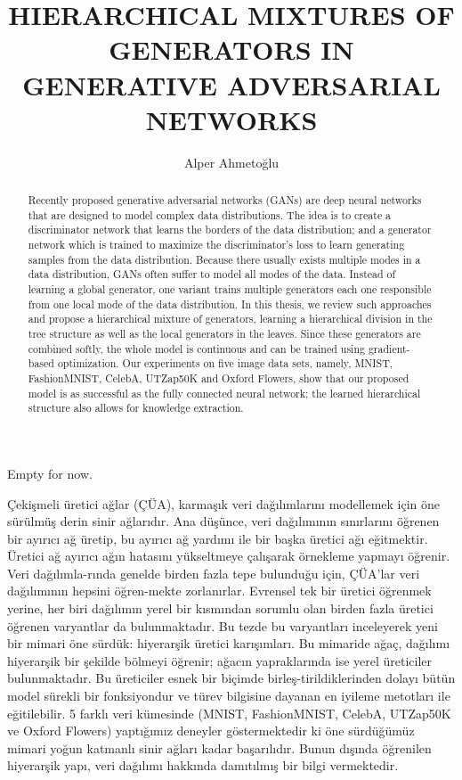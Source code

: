 \documentclass[a4paper,onesided,12pt]{report}
\title{HIERARCHICAL MIXTURES OF GENERATORS IN GENERATIVE ADVERSARIAL NETWORKS}
\author{Alper Ahmetoğlu}
\begin{document}
\makemstitle %
\makeapprovalpage
\begin{acknowledgements}
Empty for now.
\end{acknowledgements}
\begin{abstract}
Recently proposed generative adversarial networks (GANs) are deep neural networks that are designed to model complex data distributions. The idea is to create a discriminator network that learns the borders of the data distribution; and a generator network which is trained to maximize the discriminator's loss to learn generating samples from the data distribution. Because there usually exists multiple modes in a data distribution, GANs often suffer to model all modes of the data. Instead of learning a global generator, one variant trains multiple generators each one responsible from one local mode of the data distribution. In this thesis, we review such approaches and propose a hierarchical mixture of generators, learning a hierarchical division in the tree structure as well as the local generators in the leaves. Since these generators are combined softly, the whole model is continuous and can be trained using gradient-based optimization. Our experiments on five image data sets, namely, MNIST, FashionMNIST, CelebA, UTZap50K and Oxford Flowers, show that our proposed model is as successful as the fully connected neural network; the learned hierarchical structure also allows for knowledge extraction.
\end{abstract}
\begin{ozet}
Çekişmeli üretici ağlar (ÇÜA), karmaşık veri dağılımlarını modellemek için öne sürülmüş derin sinir ağlarıdır. Ana düşünce, veri dağılımının sınırlarını öğrenen bir ayırıcı ağ üretip, bu ayırıcı ağ yardımı ile bir başka üretici ağı eğitmektir. Üretici ağ ayırıcı ağın hatasını yükseltmeye çalışarak örnekleme yapmayı öğrenir. Veri dağılımla-rında genelde birden fazla tepe bulunduğu için, ÇÜA'lar veri dağılımının hepsini öğren-mekte zorlanırlar. Evrensel tek bir üretici öğrenmek yerine, her biri dağılımın yerel bir kısmından sorumlu olan birden fazla üretici öğrenen varyantlar da bulunmaktadır. Bu tezde bu varyantları inceleyerek yeni bir mimari öne sürdük: hiyerarşik üretici karışımları. Bu mimaride ağaç, dağılımı hiyerarşik bir şekilde bölmeyi öğrenir; ağacın yapraklarında ise yerel üreticiler bulunmaktadır. Bu üreticiler esnek bir biçimde birleş-tirildiklerinden dolayı bütün model sürekli bir fonksiyondur ve türev bilgisine dayanan en iyileme metotları ile eğitilebilir. 5 farklı veri kümesinde (MNIST, FashionMNIST, CelebA, UTZap50K ve Oxford Flowers) yaptığımız deneyler göstermektedir ki öne sürdüğümüz mimari yoğun katmanlı sinir ağları kadar başarılıdır. Bunun dışında öğrenilen hiyerarşik yapı, veri dağılımı hakkında damıtılmış bir bilgi vermektedir.

\end{ozet}
\end{document}
